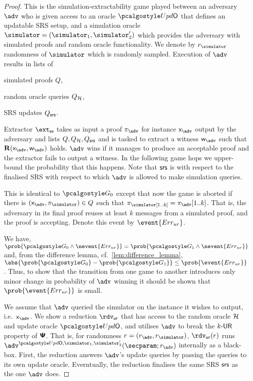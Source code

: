 \begin{proof}		
	 This is the simulation-extractability game played between an adversary
	$\advse$ who is given access to an oracle $\initU$ that defines an updatable SRS
	setup, and a simulation oracle $\simulator = (\simulator_1, \simulator_2')$ which provides the adversary with simulated
	proofs and random oracle functionality. We denote by $\rsim$
	randomness of $\simulator$ which is randomly sampled. Execution of $\advse$ results in
	lists of
	\begin{inparaenum}[(1)]
		\item simulated proofs $Q$,
		\item random oracle queries $Q_{\mathcal{H}}$,
		\item SRS updates $Q_{\mathsf{srs}}$.
	\end{inparaenum}
	Extractor $\extse$ takes as input a proof $\zkproof_{\advse}$ for instance
	$\inp_{\advse}$ output by the adversary and lists $Q, Q_{\mathcal{H}}, Q_{\mathsf{srs}}$ and is tasked
	to extract a witness $\wit_{\advse}$ such that $\REL(\inp_{\advse}, \wit_{\advse})$
	holds. $\advse$ wins if it manages to produce an acceptable proof and the extractor
	fails to output a witness. In the following game hops we upper-bound the
	probability that this happens. Note that $\mathsf{srs}$ is with respect to the finalised
	SRS with respect to which $\adv$ is allowed to make simulation queries.
	
	 This is identical to $\game{0}$ except that now the game is aborted if
	there is $(\inp_\advse, \zkproof_{\simulator}) \in Q$ such that
	$\zkproof_\simulator[1..k] = \zkproof_{\advse}[1..k]$. That is, the adversary in
	its final proof reuses at least $k$ messages from a simulated proof, and the proof
	is accepting.  Denote this event by $\event{\errur}$.
	
	 We have,
	\( \prob{\game{0} \land \nevent{\errur}} = \prob{\game{1} \land \nevent{\errur}} \)
	and, from the difference lemma, cf.~\cref{lem:difference_lemma},
	$ \abs{\prob{\game{0}} - \prob{\game{1}}} \leq \prob{\event{\errur}}\,$.  Thus, to
	show that the transition from one game to another introduces only minor change in
	probability of $\adv$ winning it should be shown that $\prob{\event{\errur}}$ is
	small.
	
	We assume that $\adv$ queried the simulator on the instance it wishes to
	output, i.e.~$\inp_{\adv}$. We show a reduction $\rdvur$ that has access to the random oracle $\mathcal{H}$ and update oracle $\initU$, and utilises $\adv$ to break the ${k\text{-}\mathsf{UR}}$ property of $\bm{\mathsf{\Psi}}$. That is, for randomness $r = (r_\adv, \rsim)$, $\rdvur (r)$ runs $\advse^{\initU, \simulator_1, \simulator_2'}(\secparam; r_\adv)$ internally as a black-box.
	First, the reduction answers $\adv$'s update queries by passing the queries to its own update oracle. Everntually, the reduction finalises the same SRS $\mathsf{srs}$ as the one $\adv$ does.
	

\end{proof}
